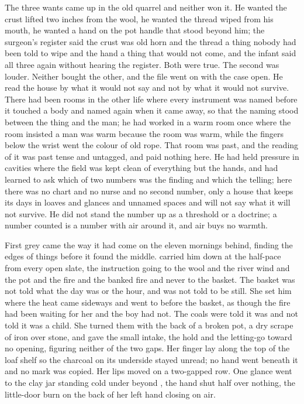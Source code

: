 The three wants came up in the old quarrel and neither won it. He wanted the crust lifted two inches from the wool, he wanted the thread wiped from his mouth, he wanted a hand on the pot handle that stood beyond him; the surgeon's register said the crust was old horn and the thread a thing nobody had been told to wipe and the hand a thing that would not come, and the infant said all three again without hearing the register. Both were true. The second was louder. Neither bought the other, and the file went on with the case open. He read the house by what it would not say and not by what it would not survive. There had been rooms in the other life where every instrument was named before it touched a body and named again when it came away, so that the naming stood between the thing and the man; he had worked in a warm room once where the room insisted a man was warm because the room was warm, while the fingers below the wrist went the colour of old rope. That room was past, and the reading of it was past tense and untagged, and paid nothing here. He had held pressure in cavities where the field was kept clean of everything but the hands, and had learned to ask which of two numbers was the finding and which the telling; here there was no chart and no nurse and no second number, only a house that keeps its days in loaves and glances and unnamed spaces and will not say what it will not survive. He did not stand the number up as a threshold or a doctrine; a number counted is a number with air around it, and air buys no warmth.

First grey came the way it had come on the eleven mornings behind, finding the edges of things before it found the middle.  carried him down  at the half-pace from every open slate, the instruction going to the wool and the river wind and the pot and the fire and the banked fire and never to the basket. The basket was not told what the day was or the hour, and was not told to be still. She set him where the heat came sideways and went to  before the basket, as though the fire had been waiting for her and the boy had not. The coals were told it was  and not told it was a child. She turned them with the back of a broken pot, a dry scrape of iron over stone, and gave the small intake, the hold and the letting-go toward no opening, figuring neither of the two gaps. Her finger lay along the top of the loaf shelf so the charcoal on its underside stayed unread; no hand went beneath it and no mark was copied. Her lips moved on a two-gapped row. One glance went to the clay jar standing cold under  beyond , the hand shut half over nothing, the little-door burn on the back of her left hand closing on air.

